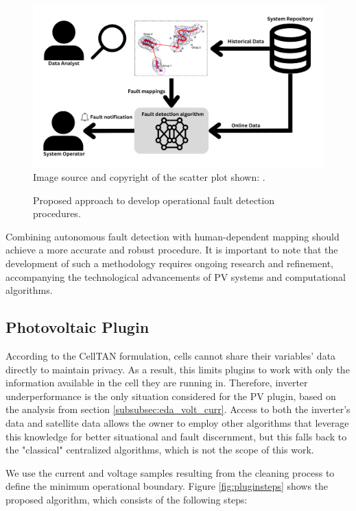 \begin{figure}[h!]
    \centering
    \includegraphics[width=\textwidth]{figures/chapter5/algorithm/approach_fault_detection.png}
    Image source and copyright of the scatter plot shown: \cite{Kumpulainen2007}.
    \caption{Proposed approach to develop operational fault detection procedures.}
    \label{fig:approach_fault_detection}
\end{figure}

Combining autonomous fault detection with human-dependent mapping should achieve a more accurate and robust procedure. It is important to note that the development of such a methodology requires ongoing research and refinement, accompanying the technological advancements of PV systems and computational algorithms.

\subsection{Photovoltaic Plugin}

According to the CellTAN formulation, cells cannot share their variables' data directly to maintain privacy. As a result, this limits plugins to work with only the information available in the cell they are running in. Therefore, inverter underperformance is the only situation considered for the PV plugin, based on the analysis from section \ref{subsubsec:eda_volt_curr}. Access to both the inverter's data and satellite data allows the owner to employ other algorithms that leverage this knowledge for better situational and fault discernment, but this falls back to the "classical" centralized algorithms, which is not the scope of this work.

We use the current and voltage samples resulting from the cleaning process to define the minimum operational boundary. Figure \ref{fig:pluginsteps} shows the proposed algorithm, which consists of the following steps:


